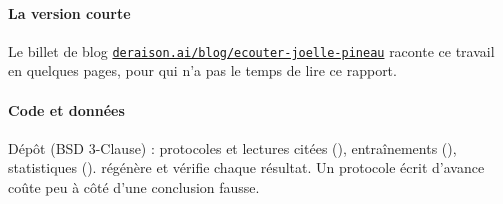 \paragraph{La version courte}
Le billet de blog \href{https://deraison.ai/blog/ecouter-joelle-pineau}{\texttt{deraison.ai/blog/ecouter-joelle-pineau}}
raconte ce travail en quelques pages, pour qui n'a pas le temps de lire ce rapport.

\paragraph{Code et données}
Dépôt \repo{} (BSD 3-Clause) : protocoles et lectures citées (), entraînements (),
statistiques ().  régénère et vérifie chaque résultat. Un
protocole écrit d'avance coûte peu à côté d'une conclusion fausse.
